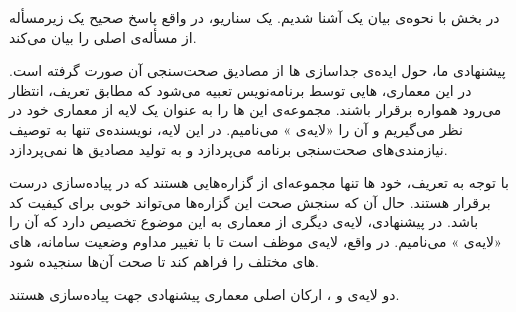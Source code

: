 
در بخش  با نحوه‌ی بیان یک  آشنا شدیم. یک سناریو، در واقع پاسخ صحیح یک زیرمسأله از مسأله‌ی اصلی را بیان می‌کند.

 پیشنهادی ما، حول ایده‌ی جداسازی ‌ها از مصادیق صحت‌سنجی آن صورت گرفته است. در این معماری، ‌هایی توسط برنامه‌نویس تعبیه می‌شود که مطابق تعریف، انتظار می‌رود همواره برقرار باشند. مجموعه‌ی این ‌ها را به عنوان یک لایه از معماری   خود در نظر می‌گیریم و آن را «لایه‌ی » می‌نامیم. در این لایه، نویسنده‌ی  تنها به توصیف نیازمندی‌های صحت‌سنجی برنامه می‌پردازد و به تولید مصادیق ‌ها نمی‌پردازد.

با توجه به تعریف، خود ‌ها تنها مجموعه‌ای از گزاره‌هایی هستند که در پیاده‌سازی درست برقرار هستند. حال آن که سنجش صحت این گزاره‌ها می‌تواند  خوبی برای کیفیت کد باشد. در  پیشنهادی، لایه‌ی دیگری از معماری  به این موضوع تخصیص دارد که آن را «لایه‌ی » می‌نامیم. در واقع، لایه‌ی  موظف است تا با تغییر مداوم وضعیت سامانه، ‌های ‌های مختلف را فراهم کند تا صحت آن‌ها سنجیده شود.

دو لایه‌ی  و ، ارکان اصلی معماری پیشنهادی جهت پیاده‌سازی   هستند.
